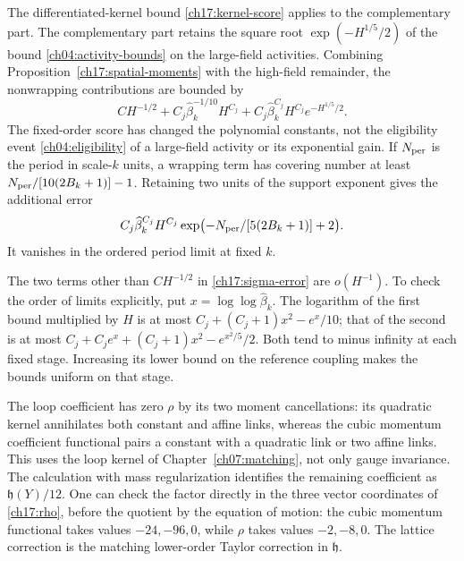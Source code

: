The differentiated-kernel
bound \eqref{ch17:kernel-score} applies to the complementary part.
The complementary part retains the square root
$\exp(-H^{1/5}/2)$ of the bound \eqref{ch04:activity-bounds} on the large-field activities. Combining Proposition~\ref{ch17:spatial-moments} with the high-field
remainder, the nonwrapping contributions are bounded by
\begin{equation}\label{ch17:sigma-error}
 C H^{-1/2}+C_j\widehat\beta_k^{-1/10}H^{C_j}
       +C_j\widehat\beta_k^{C_j}H^{C_j}e^{-H^{1/5}/2}.
\end{equation}
The fixed-order score has changed the polynomial constants, not the
eligibility event \eqref{ch04:eligibility} of a large-field activity or its exponential gain. If $N_{\rm per}$ is the
period in scale-$k$ units, a wrapping term has covering number at least
$N_{\rm per}/[10(2B_k+1)]-1$. Retaining two units of the support exponent gives the
additional error
\[
 C_j\widehat\beta_k^{C_j}H^{C_j}
       \exp\bigl(-N_{\rm per}/[5(2B_k+1)]+2\bigr).
\]
It vanishes in the ordered period limit at fixed $k$.

The two terms other than $CH^{-1/2}$ in
\eqref{ch17:sigma-error} are $o(H^{-1})$. To check the
order of limits explicitly, put $x=\log\log\widehat\beta_k$.
The logarithm of the first bound multiplied by $H$ is at most
$C_j+(C_j+1)x^2-e^x/10$; that of the second is at most
$C_j+C_je^x+(C_j+1)x^2-e^{x^2/5}/2$.
Both tend to minus infinity at each fixed stage. Increasing its lower bound on the
reference coupling makes the bounds uniform on that stage.

The loop coefficient has zero $\rho$ by its two moment cancellations:
its quadratic kernel annihilates both constant and affine links, whereas
the cubic momentum coefficient functional pairs a constant with a quadratic link or two
affine links. This uses the loop kernel of Chapter~\ref{ch07:matching},
not only gauge invariance.
The calculation with mass regularization identifies the remaining coefficient as
$\mathfrak h(Y)/12$. One can check the factor directly in the three
vector coordinates of \eqref{ch17:rho}, before the quotient by the equation of motion: the cubic momentum
functional takes values $-24,-96,0$, while $\rho$ takes values
$-2,-8,0$. The lattice correction is the matching lower-order
Taylor correction in $\mathfrak h$.

